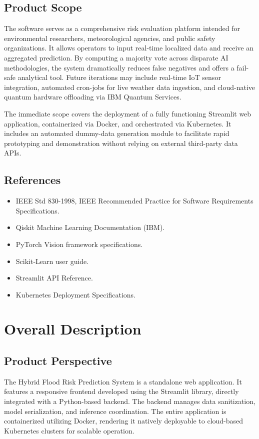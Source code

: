 \documentclass[conference]{IEEEtran}
\begin{document}
\subsection{Product Scope}
The software serves as a comprehensive risk evaluation platform intended for environmental researchers, meteorological agencies, and public safety organizations. It allows operators to input real-time localized data and receive an aggregated prediction. By computing a majority vote across disparate AI methodologies, the system dramatically reduces false negatives and offers a fail-safe analytical tool. Future iterations may include real-time IoT sensor integration, automated cron-jobs for live weather data ingestion, and cloud-native quantum hardware offloading via IBM Quantum Services.

The immediate scope covers the deployment of a fully functioning Streamlit web application, containerized via Docker, and orchestrated via Kubernetes. It includes an automated dummy-data generation module to facilitate rapid prototyping and demonstration without relying on external third-party data APIs.

\subsection{References}
\begin{itemize}
    \item IEEE Std 830-1998, IEEE Recommended Practice for Software Requirements Specifications.
    \item Qiskit Machine Learning Documentation (IBM).
    \item PyTorch Vision framework specifications.
    \item Scikit-Learn user guide.
    \item Streamlit API Reference.
    \item Kubernetes Deployment Specifications.
\end{itemize}

\section{Overall Description}
\subsection{Product Perspective}
The Hybrid Flood Risk Prediction System is a standalone web application. It features a responsive frontend developed using the Streamlit library, directly integrated with a Python-based backend. The backend manages data sanitization, model serialization, and inference coordination. The entire application is containerized utilizing Docker, rendering it natively deployable to cloud-based Kubernetes clusters for scalable operation.
\end{document}

